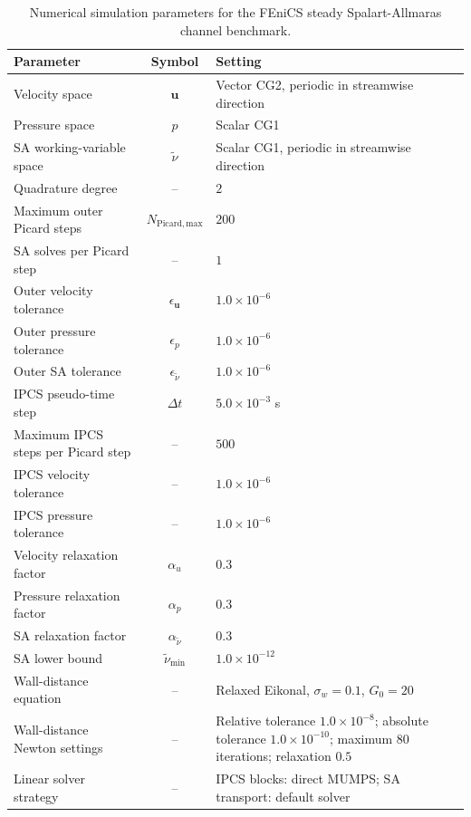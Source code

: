 \begin{table}[htbp]
	\centering
	\footnotesize
	\caption{Numerical simulation parameters for the FEniCS steady Spalart-Allmaras channel benchmark.}
	\label{tab:app_channel_numerical}
	\renewcommand{\arraystretch}{1.2}
	\begin{tabularx}{\textwidth}{l c X}
		\hline
		\textbf{Parameter} & \textbf{Symbol} & \textbf{Setting} \\
		\hline
		Velocity space & $\mathbf{u}$ & Vector CG2, periodic in streamwise direction \\
		Pressure space & $p$ & Scalar CG1 \\
		SA working-variable space & $\tilde{\nu}$ & Scalar CG1, periodic in streamwise direction \\
		Quadrature degree & -- & $2$ \\
		Maximum outer Picard steps & $N_{\mathrm{Picard,max}}$ & $200$ \\
		SA solves per Picard step & -- & $1$ \\
		Outer velocity tolerance & $\epsilon_{\mathbf{u}}$ & $1.0 \times 10^{-6}$ \\
		Outer pressure tolerance & $\epsilon_p$ & $1.0 \times 10^{-6}$ \\
		Outer SA tolerance & $\epsilon_{\tilde{\nu}}$ & $1.0 \times 10^{-6}$ \\
		IPCS pseudo-time step & $\Delta t$ & $5.0 \times 10^{-3}$ s \\
		Maximum IPCS steps per Picard step & -- & $500$ \\
		IPCS velocity tolerance & -- & $1.0 \times 10^{-6}$ \\
		IPCS pressure tolerance & -- & $1.0 \times 10^{-6}$ \\
		Velocity relaxation factor & $\alpha_u$ & $0.3$ \\
		Pressure relaxation factor & $\alpha_p$ & $0.3$ \\
		SA relaxation factor & $\alpha_{\tilde{\nu}}$ & $0.3$ \\
		SA lower bound & $\tilde{\nu}_{\min}$ & $1.0 \times 10^{-12}$ \\
		Wall-distance equation & -- & Relaxed Eikonal, $\sigma_w=0.1$, $G_0=20$ \\
		Wall-distance Newton settings & -- & Relative tolerance $1.0 \times 10^{-8}$; absolute tolerance $1.0 \times 10^{-10}$; maximum $80$ iterations; relaxation $0.5$ \\
		Linear solver strategy & -- & IPCS blocks: direct MUMPS; SA transport: default solver \\
		\hline
	\end{tabularx}
\end{table}

